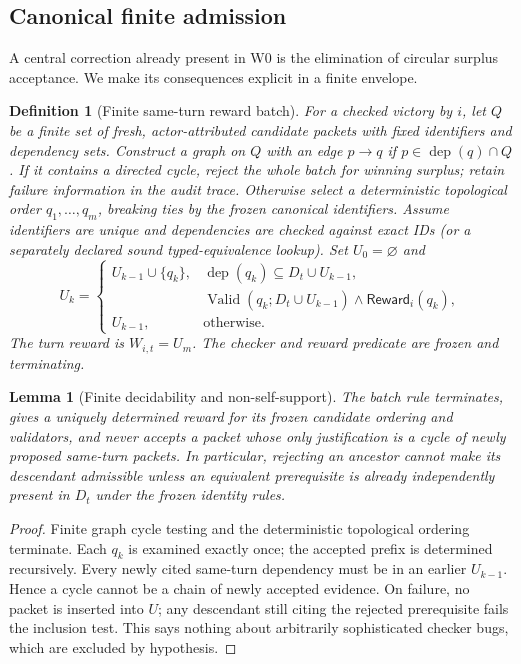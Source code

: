 \documentclass[11pt,letterpaper]{article}
\newtheorem{lemma}[theorem]{Lemma}
\newtheorem{definition}[theorem]{Definition}
\newcommand{\dep}{\operatorname{dep}}
\newcommand{\Valid}{\operatorname{Valid}}
\begin{document}
\subsection{Canonical finite admission}
A central correction already present in W0 is the elimination of circular surplus acceptance. We make its consequences explicit in a finite envelope.
\begin{definition}[Finite same-turn reward batch]\label{def:batch}
For a checked victory by $i$, let $Q$ be a finite set of fresh, actor-attributed candidate packets with fixed identifiers and dependency sets. Construct a graph on $Q$ with an edge $p\to q$ if $p\in\dep(q)\cap Q$. If it contains a directed cycle, reject the \emph{whole batch} for winning surplus; retain failure information in the audit trace. Otherwise select a deterministic topological order $q_1,\ldots,q_m$, breaking ties by the frozen canonical identifiers. Assume identifiers are unique and dependencies are checked against exact IDs (or a separately declared sound typed-equivalence lookup). Set $U_0=\varnothing$ and
\[
U_k=\begin{cases}U_{k-1}\cup\{q_k\},&\dep(q_k)\subseteq D_t\cup U_{k-1},\\[-1pt]
&\Valid(q_k;D_t\cup U_{k-1})\land\mathsf{Reward}_i(q_k),\\
U_{k-1},&\text{otherwise.}\end{cases}
\]
The turn reward is $W_{i,t}=U_m$. The checker and reward predicate are frozen and terminating.
\end{definition}
\begin{lemma}[Finite decidability and non-self-support]\label{lem:finite}
The batch rule terminates, gives a uniquely determined reward for its frozen candidate ordering and validators, and never accepts a packet whose only justification is a cycle of newly proposed same-turn packets. In particular, rejecting an ancestor cannot make its descendant admissible unless an equivalent prerequisite is already independently present in $D_t$ under the frozen identity rules.
\end{lemma}
\begin{proof}
Finite graph cycle testing and the deterministic topological ordering terminate. Each $q_k$ is examined exactly once; the accepted prefix is determined recursively. Every newly cited same-turn dependency must be in an earlier $U_{k-1}$. Hence a cycle cannot be a chain of newly accepted evidence. On failure, no packet is inserted into $U$; any descendant still citing the rejected prerequisite fails the inclusion test. This says nothing about arbitrarily sophisticated checker bugs, which are excluded by hypothesis.
\end{proof}
\end{document}

